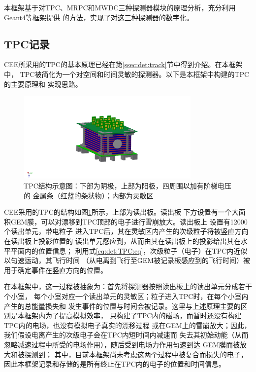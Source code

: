 \documentclass[bachelor,openany,oneside,color]{buaathesis}
\begin{document}
本框架基于对TPC、MRPC和MWDC三种探测器模块的原理分析，充分利用Geant4等框架提供
的方法，实现了对这三种探测器的数字化。

\subsection{TPC记录}\label{ssec:digi:TPC}

CEE所采用的TPC的基本原理已经在第\ref{ssec:det:track}节中得到介绍。在本框架中，
TPC被简化为一个对空间和时间灵敏的探测器。以下是本框架中构建的TPC的主要原理和
实现思路。

\begin{figure}
	\centering
	\includegraphics[width=0.8\textwidth]{./resource/CEE-TPC-Overview.png}
	\caption{TPC结构示意图：下部为阴极，上部为阳极，四周围以加有阶梯电压的
		金属条（红蓝的条状物）；内部为灵敏区}
	\label{fig:det:TPC:Overview}
\end{figure}

CEE采用的TPC的结构如图\ref{fig:det:TPC:Overview}所示，上部为读出板。读出板
下方设置有一个大面积GEM膜，可以对漂移到TPC顶部的电子进行雪崩放大。读出板上
设置有12000个读出单元\cite{技术文档}，带电粒子
进入TPC后，其在灵敏区内产生的次级粒子将被竖直方向在读出板上投影位置的
读出单元感应到，从而由其在读出板上的投影给出其在水平平面内的位置信息；
利用式\ref{eq:det:TPC:eq}，次级粒子（电子）在TPC内近似以匀速运动，其飞行时间
（从电离到飞行至GEM被记录板感应到的飞行时间）被用于确定事件在竖直方向的位置。

在本框架中，这一过程被抽象为：首先将探测器按照读出板上的读出单元分成若干个小室，
每个小室对应一个读出单元的灵敏区；粒子进入TPC时，在每个小室内产生的总能量损失和
发生事件的位置与时间会被记录。这里与上述原理主要的区别是本框架内为了提高模拟效率，
只构建了TPC内的磁场，而暂时还没有构建TPC内的电场，也没有模拟电子真实的漂移过程
或在GEM上的雪崩放大；因此，我们假设电离产生的次级电子会在TPC内短时间内减速而
失去其初始动能（从而忽略减速过程中所受的电场作用），随后受到电场力作用匀速到达
GEM膜而被放大和被探测到；
其中，目前本框架尚未考虑这两个过程中被复合而损失的电子，
因此本框架记录和存储的是所有终止在TPC内的电子的位置和时间信息。
\end{document}
